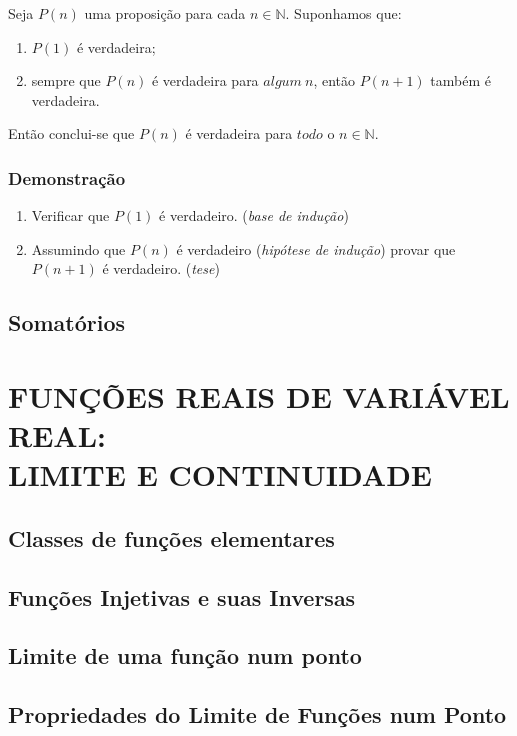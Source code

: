 \documentclass[11pt]{article}
\begin{document}
Seja $P(n)$ uma proposição para cada $n\in\mathbb{N}$. Suponhamos que:
\begin{enumerate}
    \item $P(1)$ é verdadeira;
    \item sempre que $P(n)$ é verdadeira para $algum\ n$, então $P(n+1)$ também é verdadeira.
\end{enumerate}
Então conclui-se que $P(n)$ é verdadeira para $todo$ o $n\in\mathbb{N}$.

\subsubsection{Demonstração}

\begin{enumerate}
    \item Verificar que $P(1)$ é verdadeiro. (\textit{base de indução})
    \item Assumindo que $P(n)$ é verdadeiro (\textit{hipótese de indução}) provar que $P(n+1)$ é verdadeiro. (\textit{tese})
\end{enumerate}

\subsection{Somatórios}



\newpage

\section{\MakeUppercase{Funções Reais de Variável Real: \\ Limite e Continuidade}}

\subsection{Classes de funções elementares}

\subsection{Funções Injetivas e suas Inversas}

\subsection{Limite de uma função num ponto}

\subsection{Propriedades do Limite de Funções num Ponto}
\end{document}
